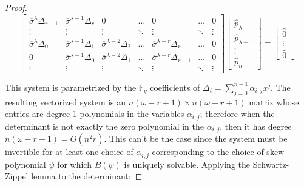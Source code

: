 \documentclass[sigconf]{acmart}
\newcommand{\F}{\mathbb{F}}
\renewcommand{\L}{\mathbb{L}}
\newcommand{\reduc}{\lambda}
\begin{document}
\begin{proof}
\begin{equation}
    \label{vectorsystem}
    \begin{bmatrix}
    \overline{\sigma}^{\lambda}\overline{\Delta}_{r - 1} & \overline{\sigma}^{\lambda-1}\overline{\Delta}_{r} & 0 & \ldots & 0 & \ldots & 0 \\
    \vdots & \vdots & \vdots & \ddots & \vdots & \ddots & \vdots \\
    \overline{\sigma}^{\lambda}\overline{\Delta}_{0} & \overline{\sigma}^{\lambda -1}\overline{\Delta}_{1} & \overline{\sigma}^{\lambda - 2}\overline{\Delta}_{2} & \ldots & \overline{\sigma}^{\lambda - r}\overline{\Delta}_{r} & \ldots & 0 \\
    0 & \overline{\sigma}^{\lambda - 1}\overline{\Delta}_{0} & \overline{\sigma}^{\lambda - 2}\overline{\Delta}_{1} & \ldots & \overline{\sigma}^{\lambda - r}\overline{\Delta}_{r-1} & \ldots & 0 \\
    \vdots & \vdots & \vdots & \ddots & \vdots & \ddots & \vdots 
    
    
    \end{bmatrix}
    \begin{bmatrix}
    \hat{p}_{\reduc} \\ \hat{p}_{\reduc - 1} \\ \vdots \\ \hat{p}_{n}
    \end{bmatrix}
    = 
    \begin{bmatrix}
     \hat{0} \\ \vdots \\ \hat{0} 
    \end{bmatrix}
\end{equation}

This system is parametrized by the $\F_q$ coefficients of $\Delta_i = \sum_{j = 0}^{n-1} \alpha_{i,j}x^j$. The resulting vectorized system is an  $ n(\omega - r + 1) \times n(\omega - r + 1)$ matrix whose entries are degree 1 polynomials in the variables $\alpha_{i,j}$; therefore when the determinant is not exactly the zero polynomial in the $\alpha_{i,j}$, then it has degree $n(\omega - r + 1) = O(n^2r)$. This can't be the case since the system must be invertible for at least one choice of $\alpha_{i,j}$ corresponding to the choice of skew-polynomial $\psi$ for which $B(\psi)$ is uniquely solvable. Applying the Schwartz-Zippel lemma to the determinant:



\end{proof}
\end{document}

